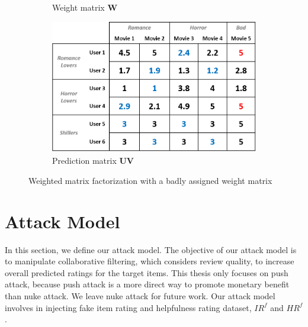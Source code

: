 \documentclass[master,english,final]{kaist-ucs}
\begin{document}
\begin{figure}[h]
\begin{subfigure}[b]{0.3\textwidth}
        \caption{Weight matrix $\bm{W}$}
        \label{wmf_bad_weight}
    \end{subfigure}
    \begin{subfigure}[b]{0.3\textwidth}
        \centering
        \includegraphics[width=\textwidth]{figure/wmf_bad_prediction}
        \caption{Prediction matrix $\bm{UV}$}
        \label{wmf_bad_prediction}
    \end{subfigure}
    \caption{Weighted matrix factorization with a badly assigned weight matrix}
    \label{wmf_bad}
\end{figure}


\section{Attack Model}
In this section, we define our attack model.
The objective of our attack model is to manipulate collaborative filtering, which considers review quality, to increase overall predicted ratings for the target items.
This thesis only focuses on push attack, because push attack is a more direct way to promote monetary benefit than nuke attack.
We leave nuke attack for future work.
Our attack model involves in injecting fake item rating and helpfulness rating dataset, $IR^f$ and $HR^f$.
\end{document}
